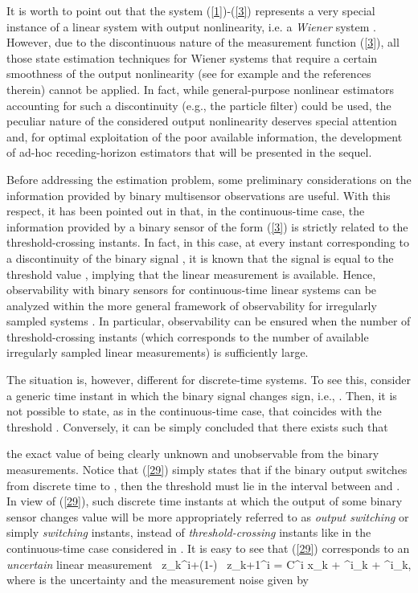 \documentclass[11pt,journal,onecolumn]{IEEEtran}
\newcommand{\be}{}
\begin{document}
It is worth to point out that the system (\ref{1})-(\ref{3}) represents a very special instance of a linear system with output nonlinearity, i.e. a \textit{Wiener} system \cite{Wiener1}. However, due to the discontinuous nature of the measurement function (\ref{3}), all those state estimation techniques for Wiener systems that require a certain smoothness of the output nonlinearity (see for example \cite{Wiener2} and the references therein) cannot be applied. In fact, while general-purpose nonlinear estimators accounting for such a discontinuity (e.g., the particle filter) could be used, the peculiar nature of the considered output nonlinearity deserves special attention and, for optimal exploitation of the poor available information,  the development of ad-hoc receding-horizon estimators that will be presented in the sequel.

Before addressing the estimation problem, some preliminary considerations on the information provided by binary multisensor observations are useful. With this respect, it has been pointed out in \cite{Irr-sampling} that, in the continuous-time case, the information provided by a binary sensor of the form (\ref{3}) is strictly related to the threshold-crossing instants. In fact, in this case, at every instant corresponding to a discontinuity of the binary signal , it is known that the signal  is equal to the threshold value , implying that the linear measurement  is available. Hence, observability with binary sensors for continuous-time linear systems can be analyzed within the more general framework of observability for irregularly sampled systems \cite{Irr-sampling}. In particular, observability can be ensured when the number of threshold-crossing instants (which corresponds to the number of available irregularly sampled linear measurements) is sufficiently large.

The situation is, however, different for discrete-time systems. To see this, consider a generic time instant  in which the binary signal  changes sign, i.e., . Then, it is not possible to state, as in the continuous-time case, that  coincides with the threshold . Conversely, it can be simply concluded that there exists  such that

the exact value of  being clearly unknown and unobservable from the binary measurements. Notice that (\ref{29}) simply states that if the binary output  switches from discrete time  to , then the threshold  must lie in the interval between  and . In view of (\ref{29}), such discrete time instants  at which the output of some binary sensor changes value will be more appropriately referred to as \textit{output switching} or simply \textit{switching} instants, instead of \textit{threshold-crossing} instants like in the continuous-time case considered in \cite{Irr-sampling}. It is easy to see that (\ref{29}) corresponds to an {\em uncertain} linear measurement
\be\label{4}
\alpha \, z_{k}^{i}+(1-\alpha) \, z_{k+1}^{i} = C^i x_{k} + \delta^i_{k} + \eta^i_{k},
\ee
where  is the uncertainty and  the measurement noise given by
\end{document}
